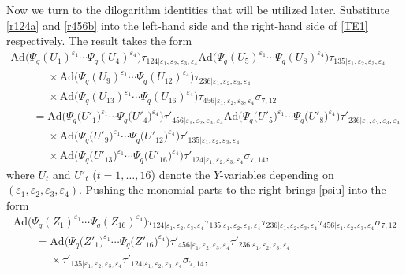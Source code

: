 Now we turn to the dilogarithm identities that will be utilized later.
Substitute \eqref{r124a} and \eqref{r456b} into the
left-hand side and the right-hand side of \eqref{TE1} respectively.
The result takes the form
\begin{gather}
\mathrm{Ad}\bigl(
\Psi_q(U_1)^{\varepsilon_1} \dotsm \Psi_q(U_4)^{\varepsilon_4}\bigr)
\tau_{124| \varepsilon_1, \varepsilon_2, \varepsilon_3, \varepsilon_4}
\mathrm{Ad}\bigl(
\Psi_q(U_5)^{\varepsilon_1} \dotsm \Psi_q(U_8)^{\varepsilon_4}\bigr)
\tau_{135| \varepsilon_1, \varepsilon_2, \varepsilon_3, \varepsilon_4}\nonumber
\\
\phantom{\qquad =}{}\times
\mathrm{Ad}\bigl(
\Psi_q(U_9)^{\varepsilon_1} \dotsm \Psi_q(U_{12})^{\varepsilon_4}\bigr)
\tau_{236 | \varepsilon_1, \varepsilon_2, \varepsilon_3, \varepsilon_4}\nonumber
\\
\phantom{\qquad =}{}\times
\mathrm{Ad}\bigl(
\Psi_q(U_{13})^{\varepsilon_1} \dotsm \Psi_q(U_{16})^{\varepsilon_4}\bigr)
\tau_{456| \varepsilon_1, \varepsilon_2, \varepsilon_3, \varepsilon_4}\sigma_{7,12}\nonumber
\\
\qquad {}=
\mathrm{Ad}\bigl(
\Psi_q\bigl(U'_1\bigr)^{\varepsilon_1} \dotsm \Psi_q\bigl(U'_4\bigr)^{\varepsilon_4}\bigr)
\tau'_{456| \varepsilon_1, \varepsilon_2, \varepsilon_3, \varepsilon_4}
\mathrm{Ad}\bigl(
\Psi_q\bigl(U'_5\bigr)^{\varepsilon_1} \dotsm \Psi_q\bigl(U'_8\bigr)^{\varepsilon_4}\bigr)
\tau'_{236| \varepsilon_1, \varepsilon_2, \varepsilon_3, \varepsilon_4}\nonumber
\\
\phantom{\qquad =}{} \times
\mathrm{Ad}\bigl(
\Psi_q\bigl(U'_9\bigr)^{\varepsilon_1} \dotsm \Psi_q\bigl(U'_{12}\bigr)^{\varepsilon_4}\bigr)
\tau'_{135| \varepsilon_1, \varepsilon_2, \varepsilon_3, \varepsilon_4}\nonumber
\\
\phantom{\qquad =}{} \times
\mathrm{Ad}\bigl(
\Psi_q\bigl(U'_{13}\bigr)^{\varepsilon_1} \dotsm \Psi_q\bigl(U'_{16}\bigr)^{\varepsilon_4}\bigr)
\tau'_{124| \varepsilon_1, \varepsilon_2, \varepsilon_3, \varepsilon_4}\sigma_{7,14},\label{psiu}
\end{gather}
where $U_t$ and $U'_t$ ($t=1, \dots, 16$) denote the $Y$-variables
depending on
$(\varepsilon_1, \varepsilon_2, \varepsilon_3, \varepsilon_4)$.
%
Pushing the monomial parts to the right brings \eqref{psiu} into the form
\begin{gather}
\mathrm{Ad}\bigl(\Psi_q(Z_1)^{\varepsilon_1}\dotsm \Psi_q(Z_{16})^{\varepsilon_{4}}\bigr)
\tau_{124|\varepsilon_1,\varepsilon_2,\varepsilon_3,\varepsilon_4}
\tau_{135|\varepsilon_1,\varepsilon_2,\varepsilon_3,\varepsilon_4}
\tau_{236|\varepsilon_1,\varepsilon_2,\varepsilon_3,\varepsilon_4}
\tau_{456|\varepsilon_1,\varepsilon_2,\varepsilon_3,\varepsilon_4}\sigma_{7,12}\nonumber
\\
\qquad=
\mathrm{Ad}\bigl(\Psi_q\bigl(Z'_1\bigr)^{\varepsilon_1}\dotsm \Psi_q\bigl(Z'_{16}\bigr)^{\varepsilon_{4}}\bigr)
\tau'_{456|\varepsilon_1,\varepsilon_2,\varepsilon_3,\varepsilon_4}
\tau'_{236|\varepsilon_1,\varepsilon_2,\varepsilon_3,\varepsilon_4}\nonumber
\\
\phantom{\qquad=}{}\times
\tau'_{135|\varepsilon_1,\varepsilon_2,\varepsilon_3,\varepsilon_4}
\tau'_{124|\varepsilon_1,\varepsilon_2,\varepsilon_3,\varepsilon_4}\sigma_{7,14},\label{zteq}
\end{gather}
